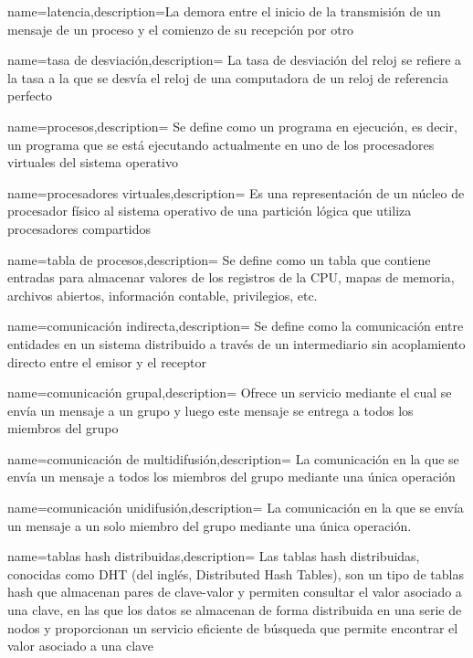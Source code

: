 {name={latencia},description={La demora entre el inicio de la transmisión de un mensaje de un proceso y el  comienzo de su recepción por otro}}	

{name={tasa de desviaci\'on},description= {La tasa de desviaci\'on del reloj se refiere a la tasa a la que se desvía el reloj de una computadora de un reloj de referencia perfecto }}		

{name={procesos},description= {Se define como un programa en ejecución, es decir, un programa que se está ejecutando actualmente en uno de los procesadores virtuales del sistema operativo}}		

{name={procesadores virtuales},description= { Es una representación de un núcleo de procesador físico al sistema operativo de una partición lógica que utiliza procesadores compartidos}}	

{name={tabla de procesos},description= {Se define como un tabla que   contiene entradas para almacenar valores de los registros de la CPU, mapas de memoria, 	archivos abiertos, información contable, privilegios, etc.}}	

{name={comunicación indirecta},description= {Se define como la comunicación entre entidades en un sistema distribuido a través de un intermediario sin acoplamiento directo entre el emisor y el receptor}}

{name={comunicación grupal},description= { Ofrece un servicio mediante el cual se envía un mensaje a un grupo y luego este mensaje se entrega a todos los miembros del grupo }}	

{name={comunicación de multidifusi\'on},description= { La comunicación en la que se envía un mensaje a todos los miembros del grupo mediante una única operación}}	

{name={comunicación unidifusi\'on},description= {La comunicación   en la que se envía un mensaje  a un solo miembro del grupo  mediante una única operación.}}

{name={tablas hash distribuidas},description= {Las tablas hash distribuidas, conocidas como DHT (del inglés, Distributed Hash Tables), son un tipo de tablas hash que almacenan pares de clave-valor y permiten consultar el valor asociado a una clave, en las que los datos se almacenan de forma distribuida en una serie de nodos  y proporcionan un servicio eficiente de búsqueda que permite encontrar el valor asociado a una clave}}

